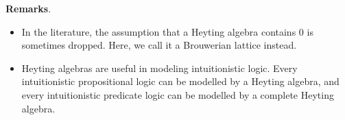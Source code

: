 \documentclass[12pt]{article}
\begin{document}
\textbf{Remarks}.  
\begin{itemize}
\item
In the literature, the assumption that a Heyting algebra contains $0$ is sometimes dropped.  Here, we call it a Brouwerian lattice instead.
\item
Heyting algebras are useful in modeling intuitionistic logic.  Every intuitionistic propositional logic can be modelled by a Heyting algebra, and every intuitionistic predicate logic can be modelled by a complete Heyting algebra.
\end{itemize}

\end{document}
